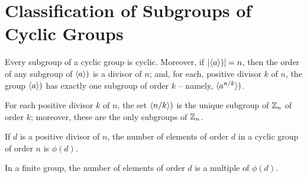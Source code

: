 \section{Classification of Subgroups of Cyclic Groups}

\begin{theorem}
	Every subgroup of a cyclic group is cyclic. Moreover, if $\left\lvert \langle a \rangle) \right\rvert = n$, then the order of any subgroup of $\langle a \rangle)$ is a divisor of $n$; and, for each, positive divisor $k$ of $n$, the group $\langle a \rangle)$ has exactly one subgroup of order $k$ -- namely, $\langle a^{n/k} \rangle)$.
\end{theorem}

\begin{corollary}
	For each positive divisor $k$ of $n$, the set $\langle n/k \rangle)$ is the unique subgroup of $\mathbb{Z}_n$ of order $k$; moreover, these are the only subgroups of $\mathbb{Z}_n$.
\end{corollary}

\begin{theorem}
	If $d$ is a positive divisor of $n$, the number of elements of order $d$ in a cyclic group of order $n$ is $\phi(d)$.
\end{theorem}

\begin{corollary}
	In a finite group, the number of elements of order $d$ is a multiple of $\phi(d)$.
\end{corollary}
